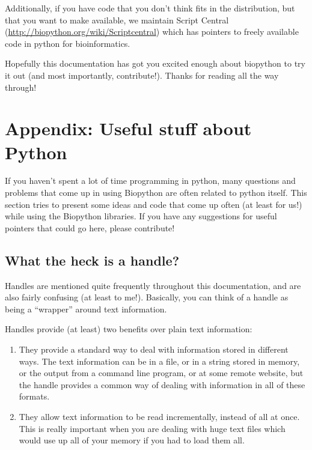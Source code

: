 \documentclass{report}
\begin{document}
Additionally, if you have code that you don't think fits in the
distribution, but that you want to make available, we maintain Script
Central (\url{http://biopython.org/wiki/Scriptcentral}) 
which has pointers to freely available code in python for bioinformatics.


Hopefully this documentation has got you excited enough about
biopython to try it out (and most importantly, contribute!). Thanks
for reading all the way through!

\chapter{Appendix: Useful stuff about Python}
\label{sec:appendix}

If you haven't spent a lot of time programming in python, many
questions and problems that come up in using Biopython are often
related to python itself. This section tries to present some ideas and 
code that come up often (at least for us!) while using the Biopython
libraries. If you have any suggestions for useful pointers that could
go here, please contribute!

\section{What the heck is a handle?}
\label{sec:appendix-handles}

Handles are mentioned quite frequently throughout this documentation,
and are also fairly confusing (at least to me!). Basically, you can
think of a handle as being a ``wrapper'' around text information.

Handles provide (at least) two benefits over plain text information:

\begin{enumerate}
  \item They provide a standard way to deal with information stored in 
  different ways. The text information can be in a file, or in a
  string stored in memory, or the output from a command line program,
  or at some remote website, but the handle provides a common way of
  dealing with information in all of these formats. 

  \item They allow text information to be read incrementally, instead
  of all at once. This is really important when you are dealing with
  huge text files which would use up all of your memory if you had to
  load them all.
\end{enumerate}
\end{document}
